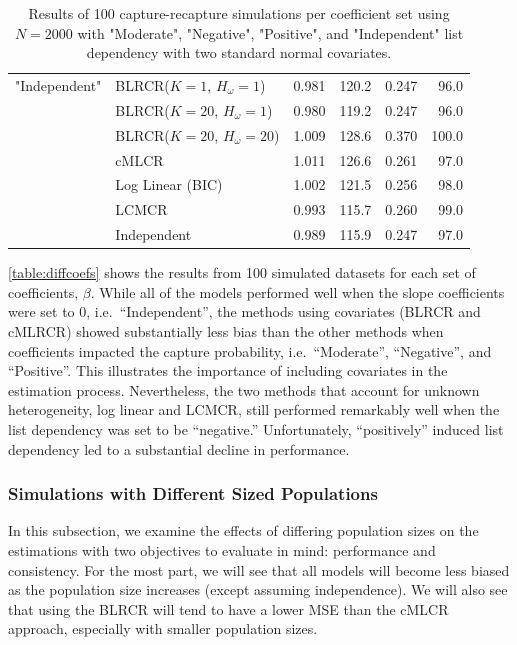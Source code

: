 \documentclass[
  12pt,
]{article}
\begin{document}
\begin{table}[H]
\begin{tabular}{||r l r r r r||}
 \hline
 "Independent" & BLRCR($K=1$, $H_\omega=1$)  & 0.981   & 120.2   & 0.247   & 96.0 \\ 
               & BLRCR($K=20$, $H_\omega=1$)    & 0.980     & 119.2     & 0.247     & 96.0 \\ 
               & BLRCR($K=20$, $H_\omega=20$)    & 1.009     & 128.6     & 0.370     & 100.0 \\                
               & cMLCR       & 1.011       & 126.6      & 0.261      & 97.0 \\
               & Log Linear (BIC)  & 1.002      & 121.5     & 0.256     & 98.0 \\ 
               & LCMCR       & 0.993       & 115.7      & 0.260      & 99.0 \\ 
               & Independent & 0.989 & 115.9& 0.247& 97.0 \\ 
 \hline
\end{tabular}
\caption{Results of 100 capture-recapture simulations per coefficient set using $N=2000$ with "Moderate", "Negative", "Positive", and "Independent" list dependency with two standard normal covariates. }
\label{table:diffcoefs}
\end{table}

\autoref{table:diffcoefs} shows the results from 100 simulated datasets
for each set of coefficients, \(\beta\). While all of the models
performed well when the slope coefficients were set to 0,
i.e.~``Independent'', the methods using covariates (BLRCR and cMLRCR)
showed substantially less bias than the other methods when coefficients
impacted the capture probability, i.e.~``Moderate'', ``Negative'', and
``Positive''. This illustrates the importance of including covariates in
the estimation process. Nevertheless, the two methods that account for
unknown heterogeneity, log linear and LCMCR, still performed remarkably
well when the list dependency was set to be ``negative.'' Unfortunately,
``positively'' induced list dependency led to a substantial decline in
performance.

\subsubsection{Simulations with Different Sized Populations}
\label{Sec:simspopsize}

In this subsection, we examine the effects of differing population sizes
on the estimations with two objectives to evaluate in mind: performance
and consistency. For the most part, we will see that all models will
become less biased as the population size increases (except assuming
independence). We will also see that using the BLRCR will tend to have a
lower MSE than the cMLCR approach, especially with smaller population
sizes.
\end{document}
